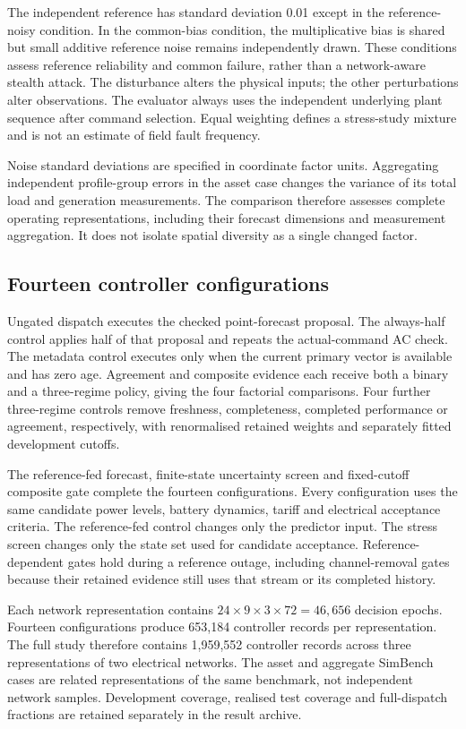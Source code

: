 \documentclass[preprint,12pt]{elsarticle}
\begin{document}
The independent reference has standard deviation 0.01 except in the reference-noisy condition. In the common-bias condition, the multiplicative bias is shared but small additive reference noise remains independently drawn. These conditions assess reference reliability and common failure, rather than a network-aware stealth attack. The disturbance alters the physical inputs; the other perturbations alter observations. The evaluator always uses the independent underlying plant sequence after command selection. Equal weighting defines a stress-study mixture and is not an estimate of field fault frequency.

Noise standard deviations are specified in coordinate factor units. Aggregating independent profile-group errors in the asset case changes the variance of its total load and generation measurements. The comparison therefore assesses complete operating representations, including their forecast dimensions and measurement aggregation. It does not isolate spatial diversity as a single changed factor.

\subsection{Fourteen controller configurations}
Ungated dispatch executes the checked point-forecast proposal. The always-half control applies half of that proposal and repeats the actual-command AC check. The metadata control executes only when the current primary vector is available and has zero age. Agreement and composite evidence each receive both a binary and a three-regime policy, giving the four factorial comparisons. Four further three-regime controls remove freshness, completeness, completed performance or agreement, respectively, with renormalised retained weights and separately fitted development cutoffs.

The reference-fed forecast, finite-state uncertainty screen and fixed-cutoff composite gate complete the fourteen configurations. Every configuration uses the same candidate power levels, battery dynamics, tariff and electrical acceptance criteria. The reference-fed control changes only the predictor input. The stress screen changes only the state set used for candidate acceptance. Reference-dependent gates hold during a reference outage, including channel-removal gates because their retained evidence still uses that stream or its completed history.

Each network representation contains $24\times9\times3\times72=46,656$ decision epochs. Fourteen configurations produce 653,184 controller records per representation. The full study therefore contains 1,959,552 controller records across three representations of two electrical networks. The asset and aggregate SimBench cases are related representations of the same benchmark, not independent network samples. Development coverage, realised test coverage and full-dispatch fractions are retained separately in the result archive.
\end{document}
